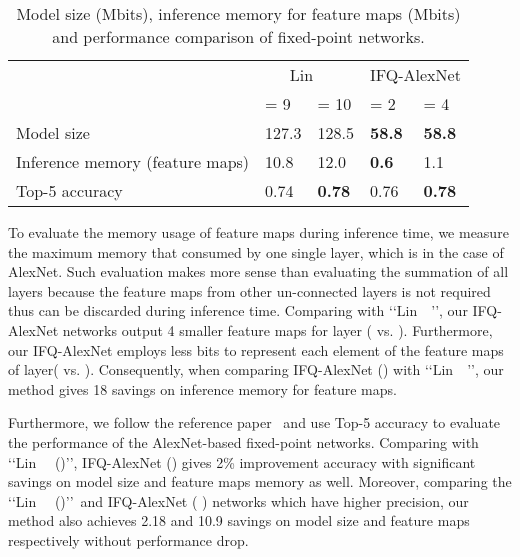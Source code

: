 \documentclass[10pt,twocolumn,letterpaper]{article}
\begin{document}
\begin{table} [!h]
\centering
\caption{Model size (Mbits), inference memory for feature maps (Mbits)  and performance comparison of fixed-point networks.}\label{tab:perfcompare}
\setlength{\tabcolsep}{2pt}
\begin{tabular}{p{2.6cm}<{\centering}|p{1.0cm}<{\centering}|p{1.2cm}<{\centering}|p{1.0cm}<{\centering}|p{1.0cm}<{\centering}}
		\hline                   & \multicolumn{2}{c|}{Lin~\etal~\cite{LinFixPoint}} &\multicolumn{2}{c}{IFQ-AlexNet}\\
		\cline{2-5}              &  = 9  &  = 10 & = 2  &  = 4 \\
		\hline\hline  {Model size}   &127.3     &128.5     & \textbf{58.8}     &\textbf{58.8}  \\
		\hline {Inference memory (feature maps) }  &10.8   &12.0 & \textbf{0.6}     &1.1  \\
		\hline {Top-5 accuracy}   &0.74  &\textbf{0.78} & 0.76     &\textbf{0.78} \\
\hline
	\end{tabular}
\end{table}

To evaluate the memory usage of feature maps during inference time, we measure the maximum memory that consumed by one single layer, which is  in the case of AlexNet. Such evaluation makes more sense than evaluating the summation of all layers because the feature maps from other un-connected layers is not required thus can be discarded during inference time. Comparing with \lq\lq Lin~\etal~\cite{LinFixPoint}\rq\rq, our IFQ-AlexNet networks output 4 smaller feature maps for  layer  ( vs. ). Furthermore, our IFQ-AlexNet employs less bits to represent each element of the feature maps of  layer( vs. ). Consequently, when comparing IFQ-AlexNet () with \lq\lq Lin~\etal~\cite{LinFixPoint}\rq\rq, our method gives 18 savings on inference memory for feature maps.

Furthermore, we follow the reference paper~\cite{LinFixPoint} and use Top-5 accuracy to evaluate the performance of the AlexNet-based fixed-point networks. Comparing with \lq\lq Lin~\etal~\cite{LinFixPoint} ()\rq\rq, IFQ-AlexNet () gives 2\% improvement accuracy with significant savings on model size and feature maps memory as well. Moreover, comparing the \lq\lq Lin~\etal~\cite{LinFixPoint} ()\rq\rq\, and IFQ-AlexNet ( ) networks which have higher precision, our method also achieves 2.18 and 10.9 savings on model size and feature maps respectively without performance drop.
\end{document}

